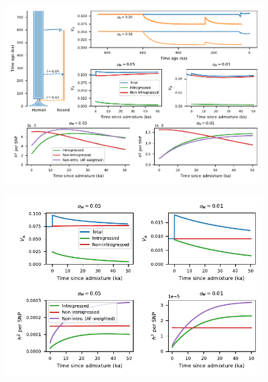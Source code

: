 \documentclass{article}
\begin{document}
\begin{figure}[ht!]
    \centering
    \includegraphics{../figures/neanderthal_admixture.pdf}
    \caption{
        \textbf{}
    }
    \label{fig:neand-to-human}
\end{figure}

\begin{figure}[ht!]
    \centering
    \includegraphics{../figures/human_admixture.pdf}
    \caption{
        \textbf{}
    }
    \label{fig:human-to-neand}
\end{figure}
\end{document}
